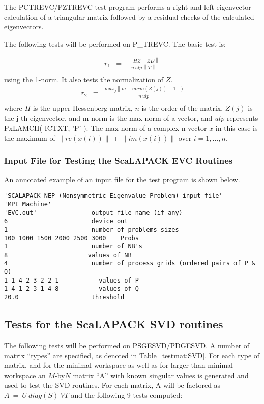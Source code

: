 \documentclass[11pt]{report}
\newcommand{\dent}{\hspace*{\parindent}}
\newcommand{\leftnorm}{\left\|}
\newcommand{\rightnorm}{\right\|}
\begin{document}
The PCTREVC/PZTREVC test program performs a right and
left eigenvector calculation of a triangular matrix followed by
a residual checks of the calculated eigenvectors.

The following tests will be performed on P\_TREVC.  The 
basic test is:

\begin{eqnarray}
          r_1&=&\frac{\leftnorm H Z - Z D \rightnorm}
                {n \, ulp \, \leftnorm T \rightnorm} \nonumber\\[1ex]
\end{eqnarray}
using the 1-norm.  It also tests the normalization of $Z$.
\begin{eqnarray}
          r_2&=&\frac{max_j \leftnorm m-norm( Z(j) ) - 1 \rightnorm)}
                 {n \, ulp } \nonumber\\[1ex]
\end{eqnarray}
where $H$ is the upper Hessenberg matrix, $n$ is the order of the
matrix, $Z(j)$ is the j-th eigenvector, and m-norm is the max-norm of a
vector, and  $ulp$ represents PxLAMCH( ICTXT, 'P' ).  The max-norm of a 
complex n-vector $x$ in this case is the
maximum of $\leftnorm re(x(i))\rightnorm$ + $\leftnorm im(x(i)) \rightnorm$
over $i = 1, \ldots, n$.

\subsubsection{Input File for Testing the ScaLAPACK EVC Routines}
\dent
An annotated example of an input file for the
test program is shown below.

\begin{verbatim}
'SCALAPACK NEP (Nonsymmetric Eigenvalue Problem) input file'
'MPI Machine'
'EVC.out'               output file name (if any)
6                       device out
1                       number of problems sizes
100 1000 1500 2000 2500 3000    Probs
1                       number of NB's
8                      values of NB
4                       number of process grids (ordered pairs of P & Q)
1 1 4 2 3 2 2 1           values of P
1 4 1 2 3 1 4 8           values of Q
20.0                    threshold
\end{verbatim}

\subsection{Tests for the ScaLAPACK SVD routines}

The following tests will be performed on PSGESVD/PDGESVD.
A number of matrix ``types'' are specified, as denoted in 
Table~\ref{testmat:SVD}.  For each type of matrix, and for the minimal
workspace as well as
for larger than minimal workspace an  $M$-by$N$ matrix ``A'' with known
singular values is generated and used to test the SVD routines.
For each matrix, A will be factored as $A~=~U~diag(S)~VT$ and the
following 9 tests computed:
\end{document}
